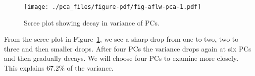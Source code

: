 \documentclass[
  letterpaper,
]{book}
\newenvironment{Shaded}{\begin{snugshade}}{\end{snugshade}}
\newcommand{\AttributeTok}[1]{\textcolor[rgb]{0.40,0.45,0.13}{#1}}
\newcommand{\DecValTok}[1]{\textcolor[rgb]{0.68,0.00,0.00}{#1}}
\newcommand{\FunctionTok}[1]{\textcolor[rgb]{0.28,0.35,0.67}{#1}}
\newcommand{\NormalTok}[1]{\textcolor[rgb]{0.00,0.23,0.31}{#1}}
\newcommand{\SpecialCharTok}[1]{\textcolor[rgb]{0.37,0.37,0.37}{#1}}
\newcommand{\StringTok}[1]{\textcolor[rgb]{0.13,0.47,0.30}{#1}}
\begin{document}
\begin{figure}[H]

{\centering \texttt{[image: ./pca\_files/figure-pdf/fig-aflw-pca-1.pdf]}

}

\caption{\label{fig-aflw-pca}Scree plot showing decay in variance of
PCs.}

\end{figure}

From the scree plot in Figure~\ref{fig-aflw-pca}, we see a sharp drop
from one to two, two to three and then smaller drops. After four PCs the
variance drops again at six PCs and then gradually decays. We will
choose four PCs to examine more closely. This explains 67.2\% of the
variance.

\begin{Shaded}
\end{Shaded}
\end{document}

